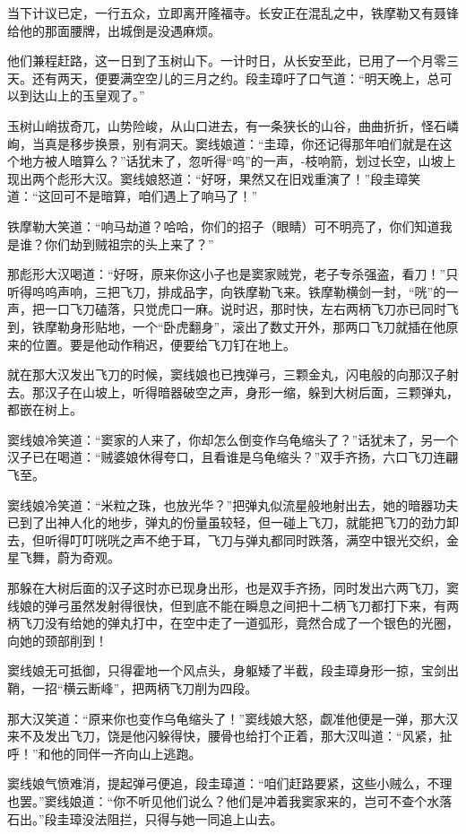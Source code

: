 \documentclass[12pt,oneside]{book}
\begin{document}
当下计议已定，一行五众，立即离开隆福寺。长安正在混乱之中，铁摩勒又有聂锋给他的那面腰牌，出城倒是没遇麻烦。

他们兼程赶路，这一日到了玉树山下。一计时日，从长安至此，已用了一个月零三天。还有两天，便要满空空儿的三月之约。段圭璋吁了口气道：``明天晚上，总可以到达山上的玉皇观了。''

玉树山峭拔奇兀，山势险峻，从山口进去，有一条狭长的山谷，曲曲折折，怪石嶙峋，当真是移步换景，别有洞天。窦线娘道：``圭璋，你还记得那年咱们就是在这个地方被人暗算么？''话犹未了，忽听得``呜''的一声，-枝响箭，划过长空，山坡上现出两个彪形大汉。窦线娘怒道：``好呀，果然又在旧戏重演了！''段圭璋笑道：``这回可不是暗算，咱们遇上了响马了！''

铁摩勒大笑道：``响马劫道？哈哈，你们的招子（眼睛）可不明亮了，你们知道我是谁？你们劫到贼祖宗的头上来了？''

那彪形大汉喝道：``好呀，原来你这小子也是窦家贼党，老子专杀强盗，看刀！''只听得呜呜声响，三把飞刀，排成品字，向铁摩勒飞来。铁摩勒横剑一封，``咣''的一声，把一口飞刀磕落，只觉虎口一麻。说时迟，那时快，左右两柄飞刀亦已同时飞到，铁摩勒身形贴地，一个``卧虎翻身''，滚出了数丈开外，那两口飞刀就插在他原来的位置。要是他动作稍迟，便要给飞刀钉在地上。

就在那大汉发出飞刀的时候，窦线娘也已拽弹弓，三颗金丸，闪电般的向那汉子射去。那汉子在山坡上，听得暗器破空之声，身形一缩，躲到大树后面，三颗弹丸，都嵌在树上。

窦线娘冷笑道：``窦家的人来了，你却怎么倒变作乌龟缩头了？''话犹未了，另一个汉子已在喝道：``贼婆娘休得夸口，且看谁是乌龟缩头？''双手齐扬，六口飞刀连翩飞至。

窦线娘冷笑道：``米粒之珠，也放光华？''把弹丸似流星般地射出去，她的暗器功夫已到了出神人化的地步，弹丸的份量虽较轻，但一碰上飞刀，就能把飞刀的劲力卸去，但听得叮叮咣咣之声不绝于耳，飞刀与弹丸都同时跌落，满空中银光交织，金星飞舞，蔚为奇观。

那躲在大树后面的汉子这时亦已现身出形，也是双手齐扬，同时发出六两飞刀，窦线娘的弹弓虽然发射得很快，但到底不能在瞬息之间把十二柄飞刀都打下来，有两柄飞刀没有给她的弹丸打中，在空中走了一道弧形，竟然合成了一个银色的光圈，向她的颈部削到！

窦线娘无可抵御，只得霍地一个风点头，身躯矮了半截，段圭璋身形一掠，宝剑出鞘，一招``横云断峰''，把两柄飞刀削为四段。

那大汉笑道：``原来你也变作乌龟缩头了！''窦线娘大怒，觑准他便是一弹，那大汉来不及发出飞刀，饶是他闪躲得快，腰骨也给打个正着，那大汉叫道：``风紧，扯呼！''和他的同伴一齐向山上逃跑。

窦线娘气愤难消，提起弹弓便追，段圭璋道：``咱们赶路要紧，这些小贼么，不理也罢。''窦线娘道：``你不听见他们说么？他们是冲着我窦家来的，岂可不查个水落石出。''段圭璋没法阻拦，只得与她一同追上山去。
\end{document}
